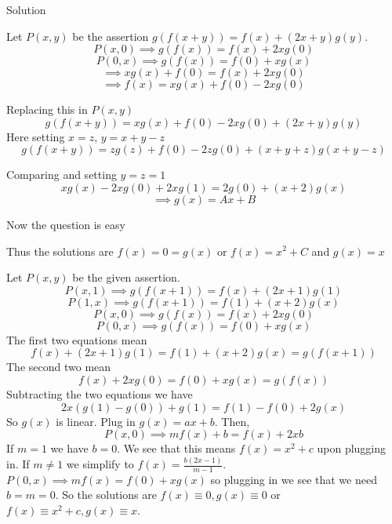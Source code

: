 \begin{solution}
	\begin{bolded}Solution\end{bolded}
Let $P(x,y)$ be the assertion $g(f(x+y)) = f(x) + (2x + y)g(y)$.
$$P(x,0) \implies g(f(x))=f(x)+2xg(0)$$
$$P(0,x) \implies g(f(x))=f(0)+xg(x)$$
$$\implies xg(x)+f(0)=f(x)+2xg(0)$$
$$\implies f(x)=xg(x)+f(0)-2xg(0)$$ 

Replacing this in $P(x,y)$
$$g(f(x+y))=xg(x)+f(0)-2xg(0)+(2x+y)g(y)$$
Here setting $x=z$, $y=x+y-z$
$$g(f(x+y))=zg(z)+f(0)-2zg(0)+(x+y+z)g(x+y-z)$$

Comparing and setting $y=z=1$
$$xg(x)-2xg(0)+2xg(1)=2g(0)+(x+2)g(x)$$
$$\implies g(x)=Ax+B$$

Now the question is easy 


Thus the solutions are $\boxed {f(x)=0=g(x)}$ or
 $\boxed {f(x)=x^2+C}$ and $\boxed {g(x)=x}$
\end{solution}



\begin{solution}
	Let $P(x, y)$ be the given assertion.
\[ P(x, 1) \implies g(f(x+1)) = f(x) + (2x+1) g(1) \]
\[ P(1, x) \implies g(f(x+1)) = f(1) + (x+2) g(x) \]
\[ P(x, 0) \implies g(f(x)) = f(x) + 2x g(0) \]
\[ P(0, x) \implies g(f(x)) = f(0) + x g(x) \]
The first two equations mean \[ f(x) + (2x+1) g(1) = f(1) + (x+2) g(x) = g(f(x+1)) \]
The second two mean \[ f(x) + 2x g(0) = f(0) + x g(x) = g(f(x)) \]
Subtracting the two equations we have \[ 2x(g(1)-g(0)) + g(1) = f(1) - f(0) + 2 g(x) \]
So $g(x)$ is linear. Plug in $g(x)=ax+b$. Then,
\[ P(x, 0) \implies mf(x) + b = f(x) + 2xb \]
If $m=1$ we have $b=0$. We see that this means $f(x) = x^2+c$ upon plugging in.
If $m \neq 1$ we simplify to $f(x) = \frac{b(2x-1)}{m-1}$. $P(0, x) \implies mf(x)=f(0)+xg(x)$ so plugging in we see that we need $b=m=0$.
So the solutions are $\boxed{f(x) \equiv 0, g(x) \equiv 0}$ or $\boxed{f(x) \equiv x^2+c, g(x) \equiv x}$.
\end{solution}



